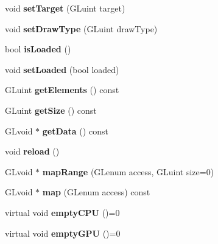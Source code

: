\begin{DoxyCompactItemize}
\mbox{\label{classflw_1_1flc_1_1IBuffer_a7d73a5dcb2cc252fe329565a4c329433}} 
void {\bfseries set\+Target} (G\+Luint target)
\item 
\mbox{\label{classflw_1_1flc_1_1IBuffer_a641903dd05dbe080d8f761ec55bffa97}} 
void {\bfseries set\+Draw\+Type} (G\+Luint draw\+Type)
\item 
\mbox{\label{classflw_1_1flc_1_1IBuffer_a5d6c3aea1c1ea096aa9f27197bb0cd64}} 
bool {\bfseries is\+Loaded} ()
\item 
\mbox{\label{classflw_1_1flc_1_1IBuffer_a27fe03746857f00fb4631c73645a3a3a}} 
void {\bfseries set\+Loaded} (bool loaded)
\item 
\mbox{\label{classflw_1_1flc_1_1IBuffer_a346e889014d7201b25f5419ac69dcbf1}} 
G\+Luint {\bfseries get\+Elements} () const
\item 
\mbox{\label{classflw_1_1flc_1_1IBuffer_a667004e8a27eed08cafc3dba183bf6a4}} 
G\+Luint {\bfseries get\+Size} () const
\item 
\mbox{\label{classflw_1_1flc_1_1IBuffer_a6c39bf5573be9be5bf917618a2d4142f}} 
G\+Lvoid $\ast$ {\bfseries get\+Data} () const
\item 
\mbox{\label{classflw_1_1flc_1_1IBuffer_a3336186b4cabbfd41764d594856ea470}} 
void {\bfseries reload} ()
\item 
\mbox{\label{classflw_1_1flc_1_1IBuffer_a1a24ce0fc4b8c5bfcc684deb7173c493}} 
G\+Lvoid $\ast$ {\bfseries map\+Range} (G\+Lenum access, G\+Luint size=0)
\item 
\mbox{\label{classflw_1_1flc_1_1IBuffer_a1b6e84be719bb485b7ef373d6497684e}} 
G\+Lvoid $\ast$ {\bfseries map} (G\+Lenum access) const
\item 
\mbox{\label{classflw_1_1flc_1_1IBuffer_a947b4716bdab96de09bf448211189ad7}} 
virtual void {\bfseries empty\+C\+PU} ()=0
\item 
\mbox{\label{classflw_1_1flc_1_1IBuffer_ac3793d00dbfcc62b7b78cd9c6edac746}} 
virtual void {\bfseries empty\+G\+PU} ()=0
\end{DoxyCompactItemize}
